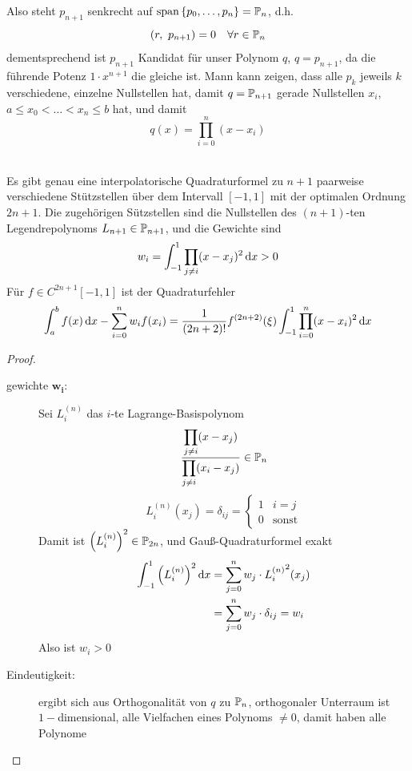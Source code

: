 \documentclass[../Skript.tex]{subfiles}
\begin{document}
{
\def\scp#1#2{\ensuremath{\left(#1,\ #2\right)}}
Also steht $p_{n+1}$ senkrecht auf $\operatorname{span}{\left\{ p_0, \dots, p_n \right\}} = \mathbb{P}_n$, d.h. 
\[
    \scp r {p_{n+1}} = 0 \largespace\forall r \in \bbP_n
    \]
    dementsprechend ist $p_{n+1}$ Kandidat für unser Polynom $q$, $q = 
    p_{n+1}$, da
    die führende Potenz $1\cdot x^{n+1}$ die gleiche ist. Mann kann 
    zeigen, dass alle
    $p_k$ jeweils $k$ verschiedene, einzelne Nullstellen hat, damit 
    $q=\mathbb{P}_{n+1}$ gerade
    Nullstellen $x_i$, $a\leq x_0 < \dots < x_n \leq b$ hat, und damit \[
        q(x) = \prod_{i=0}^n(x-x_i)\]
\begin{theorem}\hfill\\
    Es gibt genau eine interpolatorische Quadraturformel zu $n+1$ 
    paarweise verschiedene Stützstellen
    über dem Intervall $[-1, 1]$ mit der optimalen Ordnung $2n+1$. Die 
    zugehörigen Sützstellen
    sind die Nullstellen des $(n+1)$-ten Legendrepolynoms $L_{n+1}\in 
    \mathbb{P}_{n+1}$, und die Gewichte sind\[
        w_i = \int_{-1}^1 \prod_{j\neq i}(x-x_j)^2 \mathop{}\!\mathrm{d} x > 0\]
    Für $f\in C^{2n+1}[-1,1]$ ist der Quadraturfehler \[
        \int_a^b f(x)\mathop{}\!\mathrm{d} x - \sum_{i=0}^n w_if(x_i) = \frac{1}
        {(2n+2)!}f^{(2n+2)}(\xi)\int_{-1}^1\prod_{i=0}^n(x-x_i)^2\mathop{}\!\mathrm{d} x\]
\end{theorem}
\def\LgBp#1#2{\ensuremath{L_{#1}^{(#2)}}}
\begin{proof}
    \begin{description}
        \item[gewichte $\mathbf{w_i}$:]
         Sei $L_i^{(n)}$ das $i$-te Lagrange-Basispolynom \[
        \frac{\dprod_{j\neq i}(x-x_j)}{\dprod_{j\neq i}(x_i-x_j)}\in
        \Pol{n}\]
    \[L^{(n)}_i(x_j) = \delta_{ij} = \begin{cases}
        1 & i=j\\0&\text{sonst}
    \end{cases}\] Damit ist $\left(L_i^{(n)}\right)^2 \in \Pol{2n}$, und 
    Gauß-Quadraturformel exakt\begin{align*}
        \int_{-1}^1 \left(L_i^{(n)}\right)^2 \diff x &= \sum_{j=0}^n 
        w_j\cdot  {\LgBp{i}{n}}^2(x_j) \\
        &= \sum_{j=0}^n w_j \cdot \delta_{ij} = w_i
    \end{align*}
    Also ist $w_i > 0$
    \item[Eindeutigkeit:]
    ergibt sich aus Orthogonalität von $q$ zu $\Pol{n}$, orthogonaler 
    Unterraum ist $1-$dimensional,
    alle Vielfachen eines Polynoms $\neq 0$, damit haben alle Polynome 

\end{description}
\end{proof}}
\end{document}
